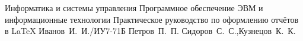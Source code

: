 \documentclass{bmstu}
\begin{document}





\makecourseworktitle
    {Информатика и системы управления} %
    {Программное обеспечение ЭВМ и информационные технологии} %
    {Практическое руководство по оформлению отчётов в LaTeX} %
    {Иванов~И.~И./ИУ7-71Б} %
    {Петров~П.~П.} %
    {Сидоров~С.~С.,Кузнецов~К.~К.} %




\end{document}
